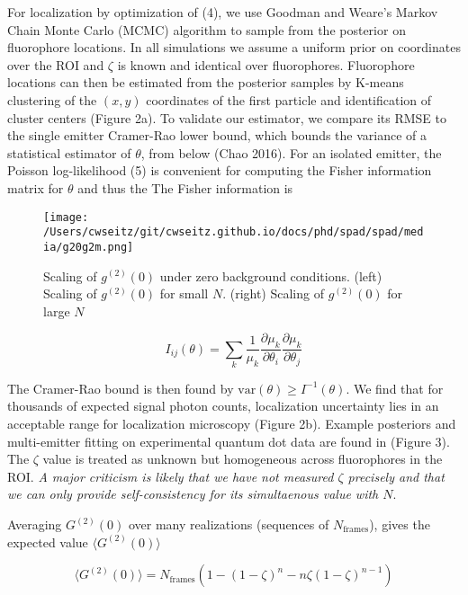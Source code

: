 For localization by optimization of (4), we use Goodman and Weare's Markov Chain Monte Carlo (MCMC) algorithm \parencite{Goodman2010} to sample from the posterior on fluorophore locations. In all simulations we assume a uniform prior on coordinates over the ROI and $\zeta$ is known and identical over fluorophores. Fluorophore locations can then be estimated from the posterior samples by K-means clustering of the $(x,y)$ coordinates of the first particle and identification of cluster centers (Figure 2a). To validate our estimator, we compare its RMSE to the single emitter Cramer-Rao lower bound, which bounds the variance of a statistical estimator of $\theta$, from below (Chao 2016). For an isolated emitter, the Poisson log-likelihood (5) is convenient for computing the Fisher information matrix for $\theta$ and thus the The Fisher information is \parencite{Smith2010}

\begin{figure}[t]
\centering
\texttt{[image: /Users/cwseitz/git/cwseitz.github.io/docs/phd/spad/spad/media/g20g2m.png]}
\caption{Scaling of $g^{(2)}(0)$ under zero background conditions. (left) Scaling of $g^{(2)}(0)$ for small $N$. (right) Scaling of $g^{(2)}(0)$ for large $N$}
\end{figure}   

\begin{equation}
I_{ij}(\theta) = \sum_{k}\frac{1}{\mu_{k}}\frac{\partial \mu_{k}}{\partial\theta_{i}}\frac{\partial \mu_{k}}{\partial\theta_{j}}
\end{equation}

The Cramer-Rao bound is then found by $\mathrm{var}(\theta) \geq I^{-1}(\theta)$. We find that for thousands of expected signal photon counts, localization uncertainty lies in an acceptable range for localization microscopy (Figure 2b). Example posteriors and multi-emitter fitting on experimental quantum dot data are found in (Figure 3). The $\zeta$ value is treated as unknown but homogeneous across fluorophores in the ROI. \textit{A major criticism is likely that we have not measured $\zeta$ precisely and that we can only provide self-consistency for its simultaenous value with $N$}.

Averaging $G^{(2)}(0)$ over many realizations (sequences of $N_{\mathrm{frames}}$), gives the expected value $\langle G^{(2)}(0)\rangle $

\begin{equation}
\langle G^{(2)}(0)\rangle = N_{\mathrm{frames}}(1 - (1-\zeta)^n - n\zeta (1-\zeta)^{n-1})
\end{equation}

